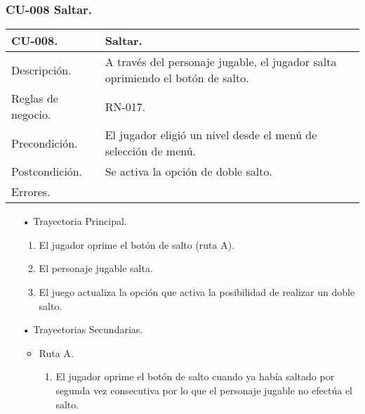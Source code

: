 \subsubsection{CU-008 Saltar.} \label{CU:08}
\begin{longtable}[c]{ | m{5cm} | m{10cm}|} 
		\hline
		\rowcolor{cyan}CU-008. & Saltar.\\ 
		\hline
		Descripción. & A través del personaje jugable, el jugador salta oprimiendo el botón de salto.\\ 
		\hline
		Reglas de negocio. & RN-017.\\ 
		\hline
		Precondición. & El jugador eligió un nivel desde el menú de selección de menú.\\
		\hline
		Postcondición. & Se activa la opción de doble salto.\\
		\hline
		Errores. & \\
		\hline
\end{longtable}

\begin{itemize}
	\item[•] Trayectoria Principal.
		\begin{enumerate}
			\item El jugador oprime el botón de salto (ruta A).
			\item El personaje jugable salta.
			\item El juego actualiza la opción que activa la posibilidad de realizar un doble salto.

		\end{enumerate}
	\item[•] Trayectorias Secundarias.
		\begin{itemize}
			\item Ruta A.
				\begin{enumerate}
					\item El jugador oprime el botón de salto cuando ya había saltado por segunda vez consecutiva por lo que el personaje jugable no efectúa el salto.
				\end{enumerate}
		\end{itemize}
\end{itemize}